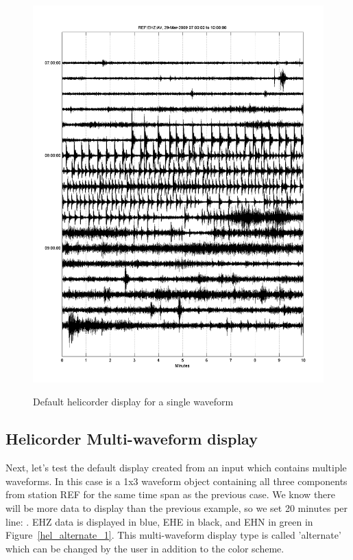 \documentclass[11pt]{article}
\begin{document}
\begin{figure}[ht] 
\centerline{\scalebox{.4} {\includegraphics{hel_single_1.png}}} 
\caption{Default helicorder display for a single waveform} 
\label{hel_single_1}
\end{figure}
\clearpage

\subsection{Helicorder Multi-waveform display}

Next, let's test the default display created from an input  which contains multiple waveforms. In this case  is a 1x3 waveform object containing all three components from station REF for the same time span as the previous case. We know there will be more data to display than the previous example, so we set 20 minutes per line: . EHZ data is displayed in blue, EHE in black, and EHN in green in Figure~\ref{hel_alternate_1}. This multi-waveform display type is called 'alternate' which can be changed by the user in addition to the color scheme.
\end{document}
